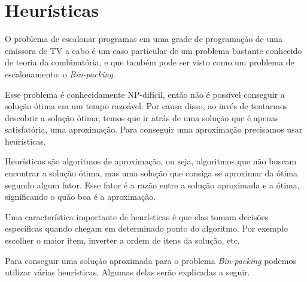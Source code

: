 \section{Heurísticas}


O problema de escalonar programas em uma grade de programação de uma emissora de TV a cabo é um caso
particular de um problema bastante conhecido de teoria da combinatória, e que também pode ser visto
como um problema de escalonamento: o \textit{Bin-packing}.

Esse problema é conhecidamente NP-difícil, então não é possível conseguir a solução ótima em um tempo
razoável. Por causa disso, ao invés de tentarmos descobrir a solução ótima, temos que ir atrás de uma
solução que é apenas satisfatória, uma aproximação. Para conseguir uma aproximação precisamos usar
heurísticas.

Heurísticas são algoritmos de aproximação, ou seja, algoritmos que não buscam encontrar a solução ótima,
mas uma solução que consiga se aproximar da ótima segundo algum fator. Esse fator é a razão entre
a solução aproximada e a ótima, significando o quão boa é a aproximação.

Uma característica importante de heurísticas é que elas tomam decisões específicas quando chegam em determinado
ponto do algoritmo. Por exemplo escolher o maior item, inverter a ordem de itens da solução, etc.

Para conseguir uma solução aproximada para o problema \textit{Bin-packing} podemos utilizar várias heurísticas.
Algumas delas serão explicadas a seguir.


